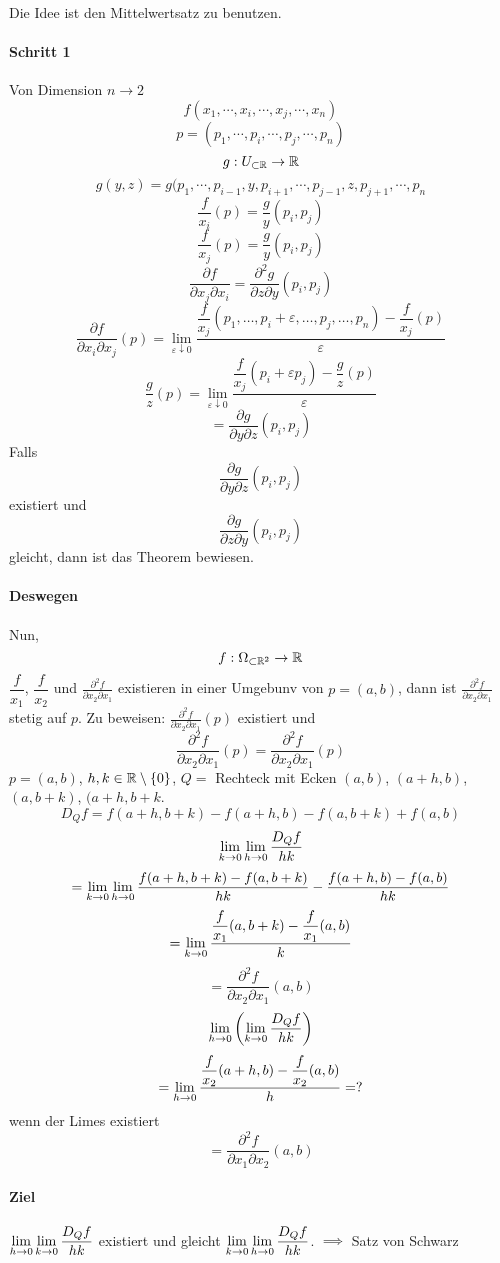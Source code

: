 \begin{Bew}
  Die Idee ist den Mittelwertsatz zu benutzen.
  \paragraph{Schritt 1} Von Dimension $n\to 2$
  \[f(x_1,\cdots,x_i,\cdots,x_j,\cdots,x_n)\]
  \[p=(p_1,\cdots,p_i,\cdots,p_j,\cdots,p_n)\]
  \[g:U_{\subset\mathbb{R}}\rightarrow\mathbb{R}\]
  \[g(y,z)=g(p_1,\cdots,p_{i-1},y,p_{i+1},\cdots,p_{j-1},z,p_{j+1},\cdots,p_n\]
  \[\dfrac{f}{x_i}(p)=\dfrac{g}{y}(p_i,p_j)\]
  \[\dfrac{f}{x_j}(p)=\dfrac{g}{y}(p_i,p_j)\]
  \[\frac{\partial f}{\partial x_j\partial x_i}=\frac{\partial^2 g}{\partial z\partial y}(p_i,p_j)\]
  \[\frac{\partial f}{\partial x_i\partial x_j}(p)=\lim_{\varepsilon\downarrow 0}\frac{\dfrac{f}{x_j}(p_1,\ldots,p_i+\varepsilon,\ldots,p_j,\ldots,p_n)-\dfrac{f}{x_j}(p)}{\varepsilon}\]
  \[\dfrac{g}{z}(p)=\lim_{\varepsilon\downarrow 0}\frac{\dfrac{f}{x_j}(p_i+\varepsilon p_j)-\dfrac{g}{z}(p)}{\varepsilon}\]
  \[=\frac{\partial g}{\partial y \partial z}(p_i,p_j)\]
  Falls
  \[\frac{\partial g}{\partial y \partial z}(p_i,p_j)\]
  existiert und
  \[\frac{\partial g}{\partial z \partial y}(p_i,p_j)\]
  gleicht, dann ist das Theorem bewiesen.
  \paragraph{Deswegen}
  Nun, 
  \[f:\Omega_{\subset\mathbb{R}^2}\rightarrow\mathbb{R}\]
  $\dfrac{f}{x_1}$, $\dfrac{f}{x_2}$ und $\frac{\partial^2 f}{\partial x_2\partial x_1}$ existieren in einer Umgebunv von $p=(a,b)$, dann ist $\frac{\partial^2 f}{\partial x_2\partial x_1}$ stetig auf $p$. Zu beweisen: $\frac{\partial^2 f}{\partial x_2\partial x_1}(p)$ existiert und
  \[\frac{\partial^2 f}{\partial x_2\partial x_1}(p)=\frac{\partial^2 f}{\partial x_2\partial x_1}(p)\]
  $p=(a,b)$, $h,k\in\mathbb{R}\setminus\left\{ 0 \right\}$, $Q=$ Rechteck mit Ecken $(a,b)$, $(a+h, b)$, $(a, b+k)$, $(a+h, b+k$.
  \[D_Qf=f(a+h,b+k)-f(a+h, b)-f(a,b+k)+f(a,b)\]
  \[\displaystyle\lim_{k\rightarrow0} \displaystyle\lim_{h\rightarrow0}\frac{D_Qf}{hk}\]
  \[=\displaystyle\lim_{k\rightarrow0} \displaystyle\lim_{h\rightarrow0}\frac{f(a+h,b+k)-f(a,b+k)}{hk}-\frac{f(a+h,b)-f(a,b)}{hk}\]
  \[=\displaystyle\lim_{k\rightarrow0}\frac{\dfrac{f}{x_1}(a,b+k)-\dfrac{f}{x_1}(a,b)}{k}\]
  \[=\frac{\partial^2f}{\partial x_2\partial x_1}(a,b)\]
  \[\displaystyle\lim_{h\rightarrow0}\left( \displaystyle\lim_{k\rightarrow0}\frac{D_Qf}{hk} \right)\]
  \[=\displaystyle\lim_{h\rightarrow0}\frac{\dfrac{f}{x_2}(a+h,b)-\dfrac{f}{x_2}(a,b)}{h}=?\]
  wenn der Limes existiert
  \[=\frac{\partial^2f}{\partial x_1\partial x_2}(a,b)\]
  \paragraph{Ziel}
  $\displaystyle\lim_{h\rightarrow0}\displaystyle\lim_{k\rightarrow0}\frac{D_Qf}{hk}$ existiert und gleicht $\displaystyle\lim_{k\rightarrow0}\displaystyle\lim_{h\rightarrow0}\frac{D_Qf}{hk}$. $\implies$ Satz von Schwarz

\end{Bew}
